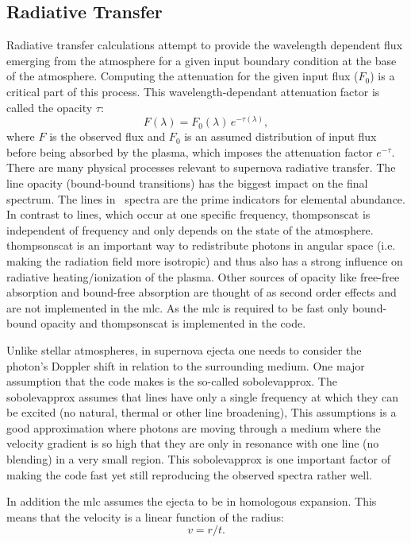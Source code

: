 \subsection{Radiative Transfer}
Radiative transfer calculations attempt to provide the wavelength dependent flux emerging from the atmosphere for a given input boundary condition at the base of the atmosphere. Computing the attenuation for the given input flux ($F_0$) is a critical part of this process. This wavelength-dependant attenuation factor is called the opacity $\tau$:
\begin{equation}
\label{eq:rad_trans}
	F(\lambda) = F_0(\lambda)\,e^{-\tau(\lambda)},
\end{equation}
where $F$ is the observed flux and $F_0$ is an assumed distribution of input flux before being absorbed by the plasma, which imposes the attenuation factor $e^{-\tau}$.
There are many physical processes relevant to supernova radiative transfer. The line opacity (bound-bound transitions) has the biggest impact on the final spectrum. The lines in \snia\ spectra are the prime indicators for elemental abundance. In contrast to lines, which occur at one specific frequency, \gls{thompsonscat} is independent of frequency and only depends on the state of the atmosphere. \gls{thompsonscat} is an important way to redistribute photons in angular space (i.e. making the radiation field more isotropic) and thus also has a strong influence on radiative heating/ionization of the plasma. Other sources of opacity like free-free absorption and bound-free absorption are thought of as second order effects and are not implemented in the \gls{mlc}. As the \gls{mlc} is required to be fast only bound-bound opacity and \gls{thompsonscat} is implemented in the code.

Unlike stellar atmospheres, in supernova ejecta one needs to consider the photon's Doppler shift in relation to the surrounding medium. One major assumption that the code makes is the so-called \gls{sobolevapprox}. The \gls{sobolevapprox} assumes that lines have only a single frequency at which they can be excited  (no natural, thermal or other line broadening), This assumptions is a good approximation where photons are moving through a medium where the velocity gradient is so high that they are only in resonance with one line (no blending) in a very small region. This \gls{sobolevapprox} is one important factor of making the code fast yet still reproducing the observed spectra rather well.

In addition the \gls{mlc} assumes the ejecta to be in homologous expansion. This means that the velocity is a linear function of the radius:
\[
	v=  r / t.
\]


